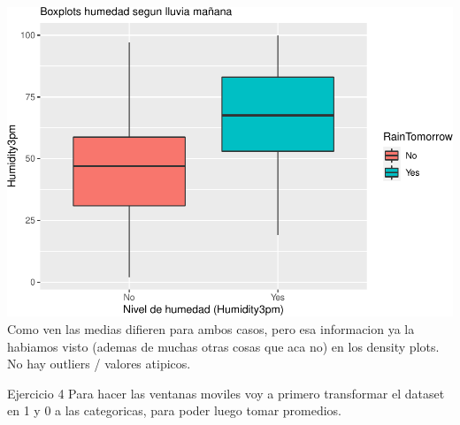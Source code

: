 \documentclass[
]{article}
\newenvironment{Shaded}{\begin{snugshade}}{\end{snugshade}}
\newcommand{\ControlFlowTok}[1]{\textcolor[rgb]{0.13,0.29,0.53}{\textbf{#1}}}
\newcommand{\DecValTok}[1]{\textcolor[rgb]{0.00,0.00,0.81}{#1}}
\newcommand{\FunctionTok}[1]{\textcolor[rgb]{0.00,0.00,0.00}{#1}}
\newcommand{\NormalTok}[1]{#1}
\newcommand{\OtherTok}[1]{\textcolor[rgb]{0.56,0.35,0.01}{#1}}
\newcommand{\SpecialCharTok}[1]{\textcolor[rgb]{0.00,0.00,0.00}{#1}}
\newcommand{\StringTok}[1]{\textcolor[rgb]{0.31,0.60,0.02}{#1}}
\begin{document}
\includegraphics{tpEstadistica_files/figure-latex/unnamed-chunk-13-1.pdf}
Como ven las medias difieren para ambos casos, pero esa informacion ya
la habiamos visto (ademas de muchas otras cosas que aca no) en los
density plots. No hay outliers / valores atipicos.

Ejercicio 4 Para hacer las ventanas moviles voy a primero transformar el
dataset en 1 y 0 a las categoricas, para poder luego tomar promedios.

\begin{Shaded}
\end{Shaded}

\begin{Shaded}
\end{Shaded}
\end{document}

